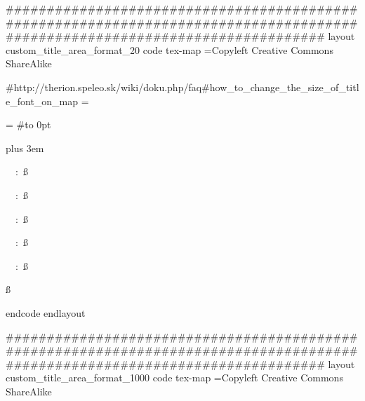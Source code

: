 #############################################################################################################################
layout custom_title_area_format_20
  code tex-map
  \copyrights={Copyleft Creative Commons ShareAlike}
  
  #http://therion.speleo.sk/wiki/doku.php/faq#how_to_change_the_size_of_title_font_on_map
    \legendcontent={%
      \hsize=\legendwidth
      #\ifnortharrow\vbox to 0pt{\line{\hfil\northarrow}\vss}\fi
      \edef\tmp{\the\cavename} \ifx\tmp\empty \else
         {\size[44]\the\cavename} \vskip1cm
      \fi
      \ifscalebar\scalebar\vskip1cm\fi
      {\rightskip=0pt plus 3em\parskip=3bp
        \edef\tmp{\the\comment} \ifx\tmp\empty \else
           {\size[20]\the\comment} \par\medskip
         \fi
      \edef\tmp{\the\cavelength} \ifx\tmp\empty \else
        {\size[20]\si\the\cavelengthtitle: \ss\the\cavelength\par}
      \fi
      \edef\tmp{\the\cavedepth} \ifx\tmp\empty \else
        {\size[20]\si\the\cavedepthtitle: \ss\the\cavedepth\par}
      \fi
      \edef\tmp{\the\exploteam} \ifx\tmp\empty \else
        {\size[20]\si\the\explotitle:
        \ss\the\exploteam\quad\si\the\explodate\par}
      \fi
      \edef\tmp{\the\topoteam} \ifx\tmp\empty \else
        {\size[20]\si\the\topotitle: \ss\the\topoteam\quad\si\the\topodate\par}
      \fi
      \edef\tmp{\the\cartoteam} \ifx\tmp\empty \else
        {\size[20]\si\the\cartotitle:
        \ss\the\cartoteam\quad\si\the\cartodate\par}
      \fi
      \edef\tmp{\the\copyrights} \ifx\tmp\empty \else
        {\size[20]\ss\the\copyrights\par}
      \fi
     }
  }
  endcode
endlayout

#############################################################################################################################
layout custom_title_area_format_1000
  code tex-map
  \copyrights={Copyleft Creative Commons ShareAlike}
  

